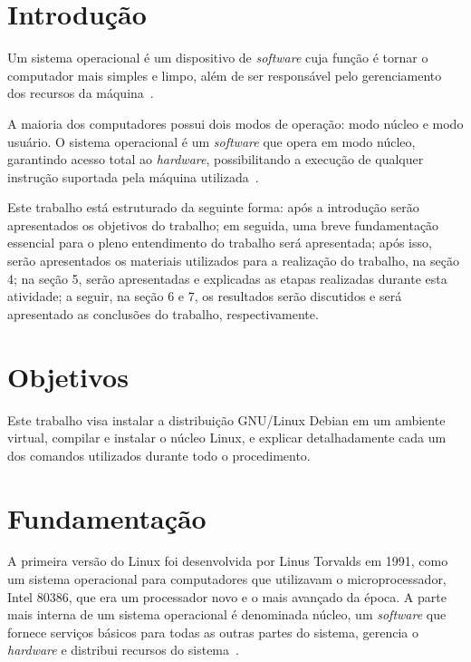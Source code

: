 \documentclass[
	12pt,				%
	oneside,   	        %
	a4paper,			%
	english,			%
	french,				%
	spanish,			%
	brazil,				%
	]{pacotes/abntex2}
\begin{document}
\makeatletter
\renewcommand{\chapter}{\@gobbletwo}
\makeatother

\section{Introdução}
\label{sec:introducao}
Um sistema operacional é um dispositivo de \textit{software} cuja função é tornar o computador mais simples e limpo, além de ser responsável pelo gerenciamento dos recursos da máquina~\cite{tanenbaum2016}.

A maioria dos computadores possui dois modos de operação: modo núcleo e modo usuário. O sistema operacional é um \textit{software} que opera em modo núcleo, garantindo acesso total ao \textit{hardware}, possibilitando a execução de qualquer instrução suportada pela máquina utilizada~\cite{tanenbaum2016}.

Este trabalho está estruturado da seguinte forma: após a introdução serão apresentados os objetivos do trabalho; em seguida, uma breve fundamentação essencial para o pleno entendimento do trabalho será apresentada; após isso, serão apresentados os materiais utilizados para a realização do trabalho, na seção 4; na seção 5, serão apresentadas e explicadas as etapas realizadas durante esta atividade; a seguir, na seção 6 e 7, os resultados serão discutidos e será apresentado as conclusões do trabalho, respectivamente.

\section{Objetivos}
\label{sec:objetivos}

Este trabalho visa instalar a distribuição GNU/Linux Debian em um ambiente virtual, compilar e instalar o núcleo Linux, e explicar detalhadamente cada um dos comandos utilizados durante todo o procedimento.

\section{Fundamentação}
\label{sec:fundamentacao}

A primeira versão do Linux foi desenvolvida por Linus Torvalds em 1991, como um sistema operacional para computadores que utilizavam o microprocessador, Intel 80386, que era um processador novo e o mais avançado da época. A parte mais interna de um sistema operacional é denominada núcleo, um \textit{software} que fornece serviços básicos para todas as outras partes do sistema, gerencia o \textit{hardware} e distribui recursos do sistema~\cite{robert2010}.
\end{document}
